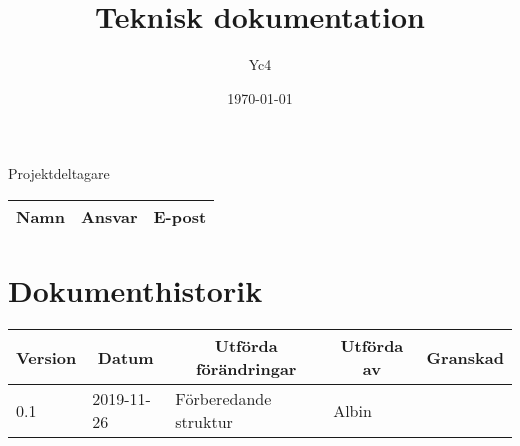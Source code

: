 \documentclass[10pt,oneside,swedish]{lips-no_customer}
\title{Teknisk dokumentation}
\author{Yc4}
\date{\today}
\begin{document}
\maketitle

\cleardoublepage
\makeprojectid

\begin{center}
  \Large Projektdeltagare
\end{center}
\begin{center}
  \begin{tabular}{|l|l|l|}
    \hline
    \textbf{Namn} & \textbf{Ansvar} & \textbf{E-post}\\
    \hline
  \end{tabular}
\end{center}

\section*{Dokumenthistorik}
\begin{tabular}{p{}|p{}|p{}|p{}|p{}} 
  \multicolumn{1}{c}{\bfseries Version} & 
  \multicolumn{1}{|c}{\bfseries Datum} & 
  \multicolumn{1}{|c}{\bfseries Utförda förändringar} & 
  \multicolumn{1}{|c}{\bfseries Utförda av} & 
  \multicolumn{1}{|c}{\bfseries Granskad}\\
  \hline
  \hline
  0.1 & 2019-11-26 & Förberedande struktur & Albin & \\
  \hline
\end{tabular}

\cleardoublepage
{}\cfoot{\thepage}


\cleardoublepage
\tableofcontents
\cleardoublepage









\cleardoublepage
\appendix





\end{document}
